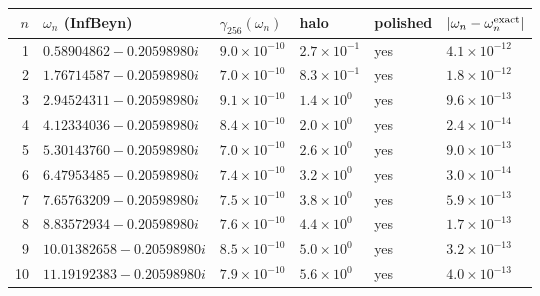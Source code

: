 \begin{tabular}{rlllll}
\toprule
$n$ & $\omega_n$ (InfBeyn) & $\gamma_{256}(\omega_n)$ & halo & polished & $|\omega_n-\omega_n^{\rm exact}|$\\
\midrule
1 & $0.58904862-0.20598980i$ & $9.0\times10^{-10}$ & $2.7\times10^{-1}$ & yes & $4.1\times10^{-12}$\\
2 & $1.76714587-0.20598980i$ & $7.0\times10^{-10}$ & $8.3\times10^{-1}$ & yes & $1.8\times10^{-12}$\\
3 & $2.94524311-0.20598980i$ & $9.1\times10^{-10}$ & $1.4\times10^{0}$ & yes & $9.6\times10^{-13}$\\
4 & $4.12334036-0.20598980i$ & $8.4\times10^{-10}$ & $2.0\times10^{0}$ & yes & $2.4\times10^{-14}$\\
5 & $5.30143760-0.20598980i$ & $7.0\times10^{-10}$ & $2.6\times10^{0}$ & yes & $9.0\times10^{-13}$\\
6 & $6.47953485-0.20598980i$ & $7.4\times10^{-10}$ & $3.2\times10^{0}$ & yes & $3.0\times10^{-14}$\\
7 & $7.65763209-0.20598980i$ & $7.5\times10^{-10}$ & $3.8\times10^{0}$ & yes & $5.9\times10^{-13}$\\
8 & $8.83572934-0.20598980i$ & $7.6\times10^{-10}$ & $4.4\times10^{0}$ & yes & $1.7\times10^{-13}$\\
9 & $10.01382658-0.20598980i$ & $8.5\times10^{-10}$ & $5.0\times10^{0}$ & yes & $3.2\times10^{-13}$\\
10 & $11.19192383-0.20598980i$ & $7.9\times10^{-10}$ & $5.6\times10^{0}$ & yes & $4.0\times10^{-13}$\\
\bottomrule
\end{tabular}
